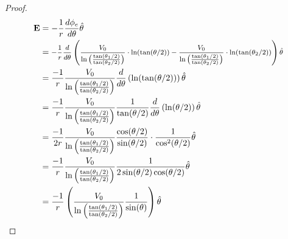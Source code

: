 \begin{proof}
    \begin{equation}
        \begin{aligned}
            \textbf{E} &= -\frac{1}{r}\frac{d\phi_{e}}{d\theta} \hat{\theta} \\
                       &= \text{\footnotesize$-\frac{1}{r} \frac{d}{d\theta}\left( \frac{V_{0}}{\ln\left(\frac{\tan(\theta_{1}/2)}{\tan(\theta_{2}/2)}\right)} \cdot \ln(\tan(\theta/2)) -\frac{V_{0}}{\ln\left(\frac{\tan(\theta_{1}/2)}{\tan(\theta_{2}/2)}\right)} \cdot \ln(\tan(\theta_{2}/2))\right) \hat{\theta}$} \\
                       &= \frac{-1}{r} \frac{V_{0}}{\ln\left(\frac{\tan(\theta_{1}/2)}{\tan(\theta_{2}/2)}\right)}  \frac{d}{d\theta} \left( \ln(\tan(\theta/2)) \right) \hat{\theta} \\
                       &=\frac{-1}{r} \frac{V_{0}}{\ln\left(\frac{\tan(\theta_{1}/2)}{\tan(\theta_{2}/2)}\right)} \frac{1}{\tan(\theta/2)} \frac{d}{d\theta}\left(\ln(\theta/2)\right)\hat{\theta} \\
                       &= \frac{-1}{2r} \frac{V_{0}}{\ln\left(\frac{\tan(\theta_{1}/2)}{\tan(\theta_{2}/2)}\right)}\frac{\cos(\theta/2)}{\sin(\theta/2)}\cdot \frac{1}{\cos^{2}(\theta/2)}\hat{\theta} \\
                       &=\frac{-1}{r} \frac{V_{0}}{\ln\left(\frac{\tan(\theta_{1}/2)}{\tan(\theta_{2}/2)}\right)}\frac{1}{2\sin(\theta/2)\cos(\theta/2)}\hat{\theta} \\
                       &=\frac{-1}{r} \left(\frac{V_{0}}{\ln\left(\frac{\tan(\theta_{1}/2)}{\tan(\theta_{2}/2)}\right)}\frac{1}{\sin(\theta)}\right)\hat{\theta}
        \end{aligned}
    \end{equation}
    

\end{proof}
